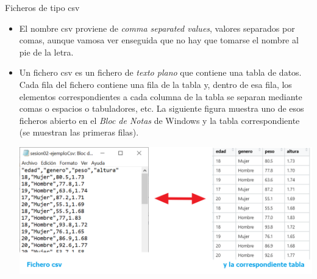 \documentclass[
  9pt,
  ignorenonframetext,
]{beamer}
\begin{document}
\begin{frame}{Ficheros de tipo csv}
\protect\hypertarget{ficheros-de-tipo-csv}{}

\begin{itemize}
\item
  El nombre csv proviene de \emph{comma separated values}, valores
  separados por comas, aunque vamosa ver enseguida que no hay que
  tomarse el nombre al pie de la letra.
\item
  Un fichero csv es un fichero de \emph{texto plano} que contiene una
  tabla de datos. Cada fila del fichero contiene una fila de la tabla y,
  dentro de esa fila, los elementos correspondientes a cada columna de
  la tabla se separan mediante comas o espacios o tabuladores, etc. La
  siguiente figura muestra uno de esos ficheros abierto en el \emph{Bloc
  de Notas} de Windows y la tabla correspondiente (se muestran las
  primeras filas).

  \begin{center}\includegraphics[width=0.8\linewidth]{../fig/02-fig01-FicherosCsv} \end{center}
\end{itemize}

\end{frame}
\end{document}
